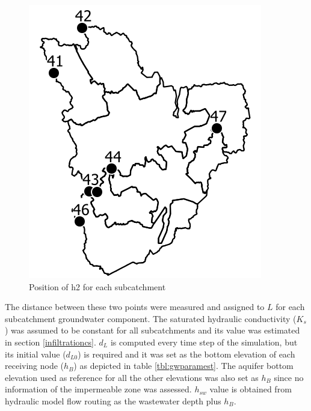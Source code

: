 \begin{figure}[h]
    \centering
	\includegraphics[scale=0.6]{figures/h2position.png}
	\caption{Position of h2 for each subcatchment}
	\label{fig:h1position}
\end{figure}


The distance between these two points were measured and assigned to $L$ for each subcatchment groundwater component. The saturated hydraulic conductivity ($K_s$) was assumed to be constant for all subcatchments and its value was estimated in section \ref{infiltrationcs}. $d_L$ is computed every time step of the simulation, but its initial value ($d_{L0}$) is required and it was set as the bottom elevation of each receiving node ($h_B$) as depicted in table \ref{tbl:gwparamest}. The aquifer bottom elevation used as reference for all the other elevations was also set as $h_B$ since no information of the impermeable zone was assessed. $h_{sw}$ value is obtained from hydraulic model flow routing as the wastewater depth plus $h_B$.

